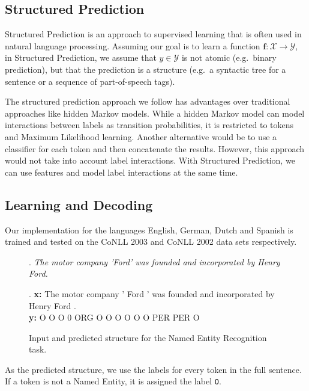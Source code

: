 \documentclass[11pt]{article}
\newcommand{\namedentity}{Named Entity}
\newcommand{\Oo}{\texttt O}
\begin{document}
\subsection{Structured Prediction}
Structured Prediction \cite{Taskar:2005:LSP:1102351.1102464} is an approach to supervised learning that is often used in natural language processing. 
Assuming our goal is to learn a function ${ \boldsymbol{f}\colon \mathcal{X}\to\mathcal{Y} }$, in Structured Prediction, we assume that $y \in \mathcal{Y}$ 
is not atomic (e.g.\ binary prediction), but that the prediction is a structure (e.g.\ a syntactic tree for a sentence or a sequence of part-of-speech tags). 

The structured prediction approach we follow has advantages over traditional approaches like hidden Markov models. While a hidden Markov model can model interactions 
between labels as transition probabilities, it is restricted to tokens and Maximum Likelihood learning. Another alternative would be to use a classifier for each 
token and then concatenate the results. However, this approach would not take into account label interactions. With Structured Prediction, we can use features and 
model label interactions at the same time.

\subsection{Learning and Decoding}

Our implementation for the languages English, German, Dutch and Spanish is trained and tested on the CoNLL 2003 and CoNLL 2002 data sets respectively. 


\begin{figure}[ht]

\ex. \emph{The motor company 'Ford' was founded and incorporated  by Henry Ford.} \label{PredEx1a}
 
\exg. \textbf{x:} The motor company ' Ford ' was founded and incorporated by Henry Ford .\\
      \textbf{y:}  O   O      O     0 ORG  O  O     O     O       O        O PER   PER  O  \label{PredEx1b} \\
\caption{Input and predicted structure for the Named Entity Recognition task.}

\end{figure}


As the predicted structure, we use the labels for every token in the full sentence. If a token is not a \namedentity, it is assigned the label \Oo.
\end{document}
